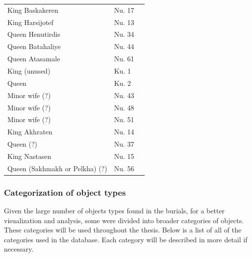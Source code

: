 {\begin{xltabular}{\textwidth}{X X X}
		\midrule
		King Baskakeren & Nu. 17 \\
		King Harsijotef & Nu. 13 \\
		Queen Henutirdis & Nu. 34 \\
		Queen Batahaliye & Nu. 44 \\
		Queen Atasamale & Nu. 61 \\
		King (unused) & Ku. 1 \\
		Queen & Ku. 2 \\
		Minor wife (?) & Nu. 43 \\
		Minor wife (?) & Nu. 48 \\
		Minor wife (?) & Nu. 51 \\
		King Akhraten & Nu. 14 \\
		Queen (?) & Nu. 37 \\
		King Nastasen & Nu. 15 \\
		Queen (Sakhmakh or Pelkha) (?) & Nu. 56 \\
	\end{xltabular}
}


\subsubsection{Categorization of object types}


Given the large number of objects types found in the burials, for a better visualization and analysis, some were divided into broader categories of objects. These categories will be used throughout the thesis. Below is a list of all of the categories used in the database. Each category will be described in more detail if necessary.


